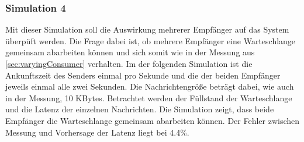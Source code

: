 \subsubsection{Simulation 4}
Mit dieser Simulation soll die Auswirkung mehrerer Empfänger auf das System überpüft werden. Die Frage dabei ist, ob mehrere Empfänger eine Warteschlange gemeinsam abarbeiten können und sich somit wie in der Messung aus \autoref{sec:varyingConsumer} verhalten. Im der folgenden Simulation ist die Ankunftszeit des Senders einmal pro Sekunde und die der beiden Empfänger jeweils einmal alle zwei Sekunden. Die Nachrichtengröße beträgt dabei, wie auch in der Messung, 10 KBytes. Betrachtet werden der Füllstand der Warteschlange und die Latenz der einzelnen Nachrichten. 
Die Simulation zeigt, dass beide Empfänger die Warteschlange gemeinsam abarbeiten können. Der Fehler zwischen Messung und Vorhersage der Latenz liegt bei 4.4\%. 




